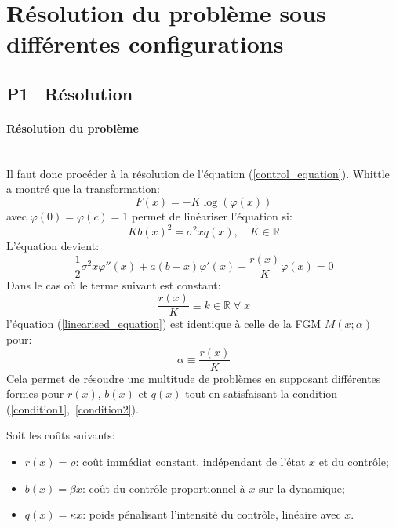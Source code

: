 \section{Résolution du problème sous différentes configurations}
\subsection{P1 \textemdash~Résolution}\label{p1}
\paragraph{Résolution du problème}\phantom{}\\
Il faut donc procéder à la résolution de l'équation (\ref{control_equation}). Whittle~\cite{whittle1982} a montré que la transformation: 
\[F(x)=-K\log(\varphi(x))\]
avec $\varphi(0)=\varphi(c)=1$ permet de linéariser l'équation si:
\begin{equation}\label{condition1}
    K{b(x)}^2=\sigma^2xq(x),\quad K\in\mathds{R}
\end{equation}
L'équation devient:
\begin{equation}\label{linearised_equation}
    \frac{1}{2}\sigma^2 x\varphi''(x) + a(b - x)\varphi'(x) - \frac{r(x)}{K}\varphi(x) = 0
\end{equation}
Dans le cas où le terme suivant est constant:
\begin{equation}\label{condition2}
    \frac{r(x)}{K}\equiv k\in\mathds{R}\;\forall\;x
\end{equation}
l'équation (\ref{linearised_equation}) est identique à celle de la \acl{FGM} $M(x;\alpha)$ pour:
\[
\alpha\equiv\frac{r(x)}{K}
\]
Cela permet de résoudre une multitude de problèmes en supposant différentes formes pour $r(x)$, $b(x)$ et $q(x)$ tout en satisfaisant la condition (\ref{condition1},~\ref{condition2}). 

Soit les coûts suivants:
\begin{itemize}
    \item $r(x) = \rho$: coût immédiat constant, indépendant de l'état $x$ et du contrôle;
    \item $b(x) = \beta x$: coût du contrôle proportionnel à $x$ sur la dynamique;
    \item $q(x) = \kappa x$: poids pénalisant l'intensité du contrôle, linéaire avec $x$.
\end{itemize}

